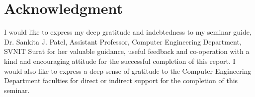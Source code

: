 \documentclass[a4paper, 12pt]{article}
\begin{document}
\section*{\centering Acknowledgment}
\vskip 0.2in
\raggedright I would like to express my deep gratitude and indebtedness to my seminar guide, Dr. Sankita J. Patel, Assistant Professor, Computer Engineering Department, SVNIT Surat for her valuable guidance, useful feedback and co-operation with a kind and encouraging attitude for the successful completion of this report. I would also like to express a deep sense of gratitude to the Computer Engineering Department faculties for direct or indirect support for the completion of this seminar.
\end{document}
